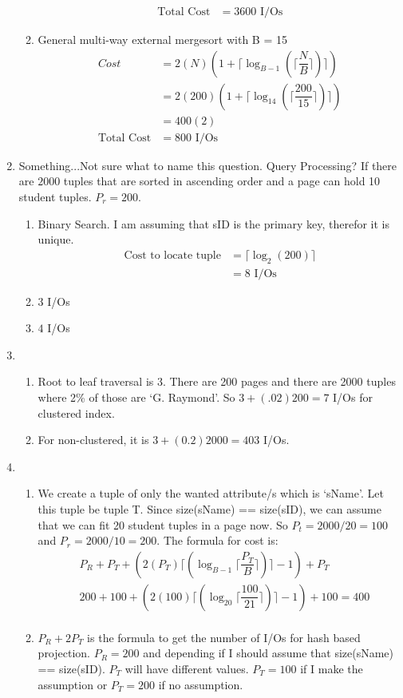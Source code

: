 \documentclass{report}
\begin{document}
\begin{enumerate}
\begin{enumerate}
\begin{align*}
				\text{Total Cost} &= 3600 \text{ I/Os}
			\end{align*}
			\item General multi-way external mergesort with B = 15
			\begin{align*}
				Cost &= 2(N)(1 + \lceil\log_{B-1}(\lceil\dfrac{N}{B}\rceil)\rceil) \\
				&= 2(200)(1 + \lceil\log_{14}(\lceil\dfrac{200}{15}\rceil)\rceil) \\
				&= 400(2) \\
				\text{Total Cost} &= 800 \text{ I/Os}
			\end{align*}
		\end{enumerate}
		\item Something...Not sure what to name this question. Query Processing?
		If there are $2000$ tuples that are sorted in ascending order and a page can hold 10 student tuples. $P_r = 200$.
		\begin{enumerate}
			\item Binary Search. I am assuming that sID is the primary key, therefor it is unique.
			\begin{align*}
				\text{Cost to locate tuple} &= \lceil \log_2(200) \rceil \\
				&= 8 \text{ I/Os}
			\end{align*}

			\item $3$ I/Os
			\item $4$ I/Os
		\end{enumerate}
		\item 
		\begin{enumerate}
			\item Root to leaf traversal is $3$. There are 200 pages and there are 2000 tuples where 2\% of those are `G. Raymond'. So $3 + (.02)200 = 7$ I/Os for clustered index.
			\item For non-clustered, it is $3 + (0.2)2000 = 403$ I/Os.
		\end{enumerate}
		\item 
		\begin{enumerate}
			\item We create a tuple of only the wanted attribute/s which is `sName'. Let this tuple be tuple T. Since size(sName) == size(sID), we can assume that we can fit 20 student tuples in a page now. So $P_t = 2000/20 = 100$ and $P_r = 2000/10 = 200$. The formula for cost is:
			\begin{align*}
				&P_R + P_T + ( 2(P_T) \lceil(\log_{B-1} \lceil\dfrac{P_T}{B}\rceil)\rceil - 1) + P_T \\
				&200 + 100 + ( 2(100) \lceil(\log_{20} \lceil\dfrac{100}{21}\rceil)\rceil -1 ) + 100 = 400 \\
			\end{align*}
			\item $P_R + 2 P_T$ is the formula to get the number of I/Os for hash based projection. $P_R = 200$ and depending if I should assume that size(sName) == size(sID). $P_T$ will have different values. $P_T = 100$ if I make the assumption or $P_T = 200$ if no assumption. \\


\end{enumerate}
\end{enumerate}
\end{document}
